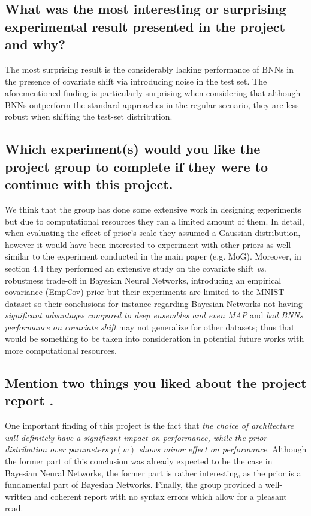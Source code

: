 \documentclass{article}
\begin{document}
\subsection{What was the most interesting or surprising experimental result presented in the project and why?}
The most surprising result is the considerably lacking performance of BNNs in the presence of covariate shift via introducing noise in the test set. The aforementioned finding is particularly surprising when considering that although BNNs outperform the standard approaches in the regular scenario, they are less robust when shifting the test-set distribution.

\subsection{Which experiment(s) would you like the project group to complete if
they were to continue with this project.}
We think that the group has done some extensive work in designing experiments but due to computational resources they ran a limited amount of them. In detail, when evaluating the effect of prior’s scale they assumed a Gaussian distribution, however it would have been interested to experiment with other priors as well similar to the experiment conducted in the main paper (e.g. MoG). Moreover, in section 4.4 they performed an extensive study on the covariate shift \textit{vs.} robustness trade-off in Bayesian Neural Networks, introducing an empirical covariance (EmpCov) prior but their experiments are limited to the MNIST dataset so their conclusions for instance regarding Bayesian Networks not having \textit{significant advantages compared to deep ensembles and even MAP} and \textit{bad BNNs performance on covariate shift} may not generalize for other datasets; thus that would be something to be taken into consideration in potential future works with more computational resources.

\subsection{Mention two things you liked about the project report .}
One important finding of this project is the fact that \textit{the choice of architecture will definitely have a significant impact on performance, while the prior distribution over parameters $p(w)$ shows minor effect on performance}. Although the former part of this conclusion was already expected to be the case in Bayesian Neural Networks, the former part is rather interesting, as the prior is a fundamental part of Bayesian Networks. Finally, the group provided a well-written and coherent report with no syntax errors which allow for a pleasant read. 
\end{document}
